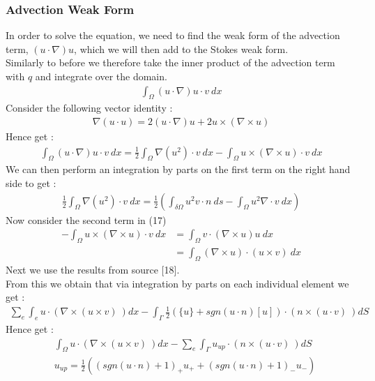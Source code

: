 \documentclass[11pt,twoside,a4paper]{article}
\begin{document}
\subsubsection{Advection Weak Form}
In order to solve the equation, we need to find the weak form of the advection term, $(u \cdot \nabla) u$, which we will then add to the Stokes weak form.\\
Similarly to before we therefore take the inner product of the advection term with $q$ and integrate over the domain.
\begin{align}
\int_\Omega (u \cdot \nabla)u \cdot v \ dx
\end{align}
Consider the following vector identity :
\begin{align*}
\nabla (u \cdot u) = 2 (u \cdot \nabla) u + 2 u \times (\nabla \times u)
\end{align*}
Hence get :
\begin{align}
\int_\Omega (u \cdot \nabla)u \cdot v \ dx = \frac{1}{2} \int_\Omega \nabla (u^2) \cdot v \ dx - \int_{\Omega} u \times (\nabla \times u) \cdot v \ dx
\end{align}
We can then perform an integration by parts on the first term on the right hand side to get :
\begin{align}
 \frac{1}{2} \int_\Omega \nabla (u^2) \cdot v \ dx = \frac{1}{2} (\int_{\delta \Omega } u^2 v \cdot n \ ds - \int_\Omega u^2 \nabla \cdot v \ dx)
\end{align}
Now consider the second term in (17)
\begin{align*}
- \int_{\Omega} u \times (\nabla \times u) \cdot v \ dx &= \int_{\Omega} v \cdot (\nabla \times u) u \ dx   \\
&=  \int_{\Omega} (\nabla \times u) \cdot (u \times v)  \ dx
\end{align*}
Next we use the results from source [18].\\
From this we obtain that via integration by parts on each individual element we get :
\begin{align*}
\sum_e \int_e u \cdot (\nabla \times (u \times v) \ ) dx - \int_{\Gamma} \frac{1}{2}(\{u\} + sgn(u \cdot n)[u]) \cdot (n \times (u \cdot v) \ ) dS
\end{align*}
Hence get :
\begin{align}
&\int_\Omega u \cdot (\nabla \times (u \times v) \ ) dx -  \sum_e \int_{\Gamma} u_{up} \cdot (n \times (u \cdot v) \ ) dS \\
& u_{up} = \frac{1}{2}((sgn(u \cdot n) + 1)_+ u_+ + (sgn (u \cdot n) +1)_- u_-)
\end{align}
\end{document}
